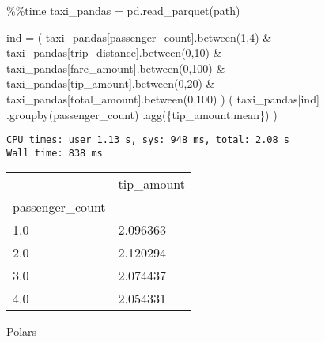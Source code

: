 \documentclass[
  letterpaper,
  DIV=11,
  numbers=noendperiod]{scrartcl}
\newenvironment{Shaded}{\begin{snugshade}}{\end{snugshade}}
\newcommand{\DecValTok}[1]{\textcolor[rgb]{0.68,0.00,0.00}{#1}}
\newcommand{\NormalTok}[1]{\textcolor[rgb]{0.00,0.23,0.31}{#1}}
\newcommand{\OperatorTok}[1]{\textcolor[rgb]{0.37,0.37,0.37}{#1}}
\newcommand{\StringTok}[1]{\textcolor[rgb]{0.13,0.47,0.30}{#1}}
\begin{document}
\begin{Shaded}
\begin{Highlighting}[]
\OperatorTok{\%\%}\NormalTok{time }
\NormalTok{taxi\_pandas }\OperatorTok{=}\NormalTok{ pd.read\_parquet(path)}

\NormalTok{ind }\OperatorTok{=}\NormalTok{ (}
\NormalTok{    taxi\_pandas[}\StringTok{\textquotesingle{}passenger\_count\textquotesingle{}}\NormalTok{].between(}\DecValTok{1}\NormalTok{,}\DecValTok{4}\NormalTok{) }
    \OperatorTok{\&}\NormalTok{ taxi\_pandas[}\StringTok{\textquotesingle{}trip\_distance\textquotesingle{}}\NormalTok{].between(}\DecValTok{0}\NormalTok{,}\DecValTok{10}\NormalTok{) }
    \OperatorTok{\&}\NormalTok{ taxi\_pandas[}\StringTok{\textquotesingle{}fare\_amount\textquotesingle{}}\NormalTok{].between(}\DecValTok{0}\NormalTok{,}\DecValTok{100}\NormalTok{) }
    \OperatorTok{\&}\NormalTok{ taxi\_pandas[}\StringTok{\textquotesingle{}tip\_amount\textquotesingle{}}\NormalTok{].between(}\DecValTok{0}\NormalTok{,}\DecValTok{20}\NormalTok{) }
    \OperatorTok{\&}\NormalTok{ taxi\_pandas[}\StringTok{\textquotesingle{}total\_amount\textquotesingle{}}\NormalTok{].between(}\DecValTok{0}\NormalTok{,}\DecValTok{100}\NormalTok{)}
\NormalTok{)}
\NormalTok{(}
\NormalTok{    taxi\_pandas[ind]}
\NormalTok{    .groupby(}\StringTok{\textquotesingle{}passenger\_count\textquotesingle{}}\NormalTok{)}
\NormalTok{    .agg(\{}\StringTok{\textquotesingle{}tip\_amount\textquotesingle{}}\NormalTok{:}\StringTok{\textquotesingle{}mean\textquotesingle{}}\NormalTok{\})}
\NormalTok{)}
\end{Highlighting}
\end{Shaded}

\begin{verbatim}
CPU times: user 1.13 s, sys: 948 ms, total: 2.08 s
Wall time: 838 ms
\end{verbatim}

\begin{longtable}[]{@{}ll@{}}
\toprule()
& tip\_amount \\
passenger\_count & \\
\midrule()
\endhead
1.0 & 2.096363 \\
2.0 & 2.120294 \\
3.0 & 2.074437 \\
4.0 & 2.054331 \\
\bottomrule()
\end{longtable}

Polars
\end{document}
